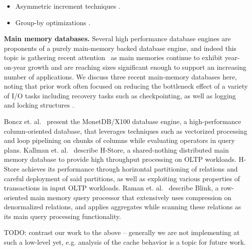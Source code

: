 \begin{itemize}
  \item Asymmetric increment techniques \cite{yang-icde:05}.
  \item Group-by optimizations \cite{yan-icde:94}.
\end{itemize}


\noindent \textbf{Main memory databases.}
Several high performance database engines are proponents of a purely main-memory
backed database engine, and indeed this topic is gathering recent
attention~\cite{kallman-pvldb:08,raman-icde:08} as main memories continue to
exhibit year-on-year growth and are reaching sizes significant enough to support
an increasing number of applications. We discuss three recent main-memory
databases here, noting that prior work often focused on reducing the bottleneck
effect of a variety of I/O tasks including recovery tasks such as
checkpointing, as well as logging and locking structures
\cite{bohannon-vldb:98,bohannon-sigmod:99}.

Boncz et. al.~\cite{boncz-cidr:05} present the MonetDB/X100 database engine, a
high-performance column-oriented database, that leverages techniques
such as vectorized processing and loop pipelining on chunks of columns while
evaluating operators in query plans.
Kallman et. al.~\cite{kallman-pvldb:08} describe H-Store, a shared-nothing
distributed main memory database to provide high throughput processing on OLTP
workloads. H-Store achieves its performance through horizontal partitioning of
relations and careful deployment of said partitions, as well as exploiting
various properties of transactions in input OLTP workloads.
Raman et. al.~\cite{raman-icde:08} describe Blink, a row-oriented main memory
query processor that extensively uses compression on denormalized relations, and
applies aggregates while scanning these relations as its main query processing
functionality.

TODO: contrast our work to the above -- generally we are not implementing at
such a low-level yet, e.g. analysis of the cache behavior is a topic for future
work.

